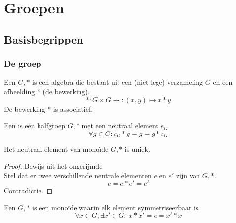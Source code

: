 \documentclass[main.tex]{subfiles}
\begin{document}
\chapter{Groepen}
\label{cha:groepen}

\section{Basisbegrippen}
\label{sec:basisbegrippen}

\subsection{De groep}
\label{sec:de-groep}

\begin{de}
  Een  $G,*$ is een algebra die bestaat uit een (niet-lege) verzameling $G$ en een afbeelding $*$ (de bewerking).
  \[ *: G \times G \rightarrow: (x,y) \mapsto x * y \]
  De bewerking $*$ is associatief.
\end{de}

\begin{de}
  Een  is een halfgroep $G,*$ met een neutraal element $e_{G}$.
  \[ \forall g \in G: e_{G} * g = g = g * e_{G} \]
\end{de}

\begin{st}
  \label{st:neutraal-element-uniek}
  Het neutraal element van mono\"ide $G,*$ is uniek.

  \begin{proof}
    Bewijs uit het ongerijmde\\
    Stel dat er twee verschillende neutrale elementen $e$ en $e'$ zijn van $G,*$.
    \[ e = e * e' = e' \]
    Contradictie.
  \end{proof}
\end{st}

\begin{de}
  \label{de:groep}
  Een  $G,*$ is een mono\"ide waarin elk element symmetriseerbaar is.
  \[ \forall x \in G, \exists x' \in G:\ x * x' = e = x' * x \]
\end{de}
\end{document}
